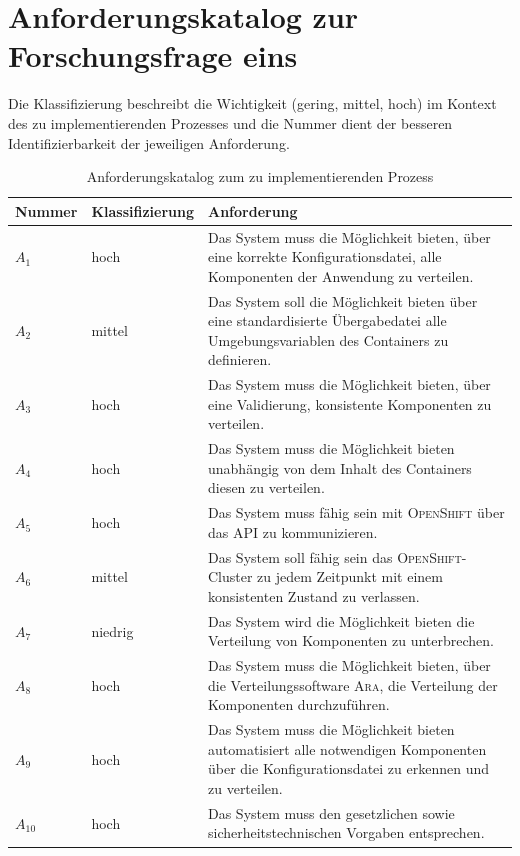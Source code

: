 \section{Anforderungskatalog zur Forschungsfrage eins}
Die Klassifizierung beschreibt die Wichtigkeit (gering, mittel, hoch) im Kontext des
zu implementierenden Prozesses und die Nummer dient der besseren Identifizierbarkeit der jeweiligen Anforderung.
\begin{table}[h!]
	\centering
	
	\begin{tabular}{@{}llp{9.0cm}@{}}\toprule[1.5pt]
		
		\textbf{Nummer} & \textbf{Klassifizierung} & \textbf{Anforderung} \\ \midrule
		
		$A_{1}$ & hoch & Das System muss die Möglichkeit bieten, über eine korrekte Konfigurationsdatei, alle Komponenten der Anwendung zu verteilen.           \\
		$A_{2}$ & mittel & Das System soll die Möglichkeit bieten über eine standardisierte Übergabedatei alle Umgebungsvariablen des Containers zu definieren. \\
		$A_{3}$ & hoch & Das System muss die Möglichkeit bieten, über eine Validierung, konsistente Komponenten zu verteilen.\\
		$A_{4}$ & hoch & Das System muss die Möglichkeit bieten unabhängig von dem Inhalt des Containers diesen zu verteilen.\\
		$A_{5}$ & hoch & Das System muss fähig sein mit \textsc{OpenShift} über das \ac{API} zu kommunizieren. \\
		$A_{6}$ & mittel & Das System soll fähig sein das \textsc{OpenShift}-Cluster zu jedem Zeitpunkt mit einem konsistenten Zustand zu verlassen. \\
		$A_{7}$ & niedrig & Das System wird die Möglichkeit bieten die Verteilung von Komponenten zu unterbrechen. \\
		$A_{8}$ & hoch & Das System muss die Möglichkeit bieten, über die Verteilungssoftware \textsc{Ara}, die Verteilung der Komponenten durchzuführen. \\
		$A_{9}$ & hoch & Das System muss die Möglichkeit bieten automatisiert alle notwendigen Komponenten über die Konfigurationsdatei zu erkennen und zu verteilen. \\
		$A_{10}$ & hoch & Das System muss den gesetzlichen sowie sicherheitstechnischen Vorgaben entsprechen.\\
		
		\bottomrule[1.5pt]
	\end{tabular}
	
	\caption{Anforderungskatalog zum zu implementierenden Prozess}
	\label{tab:anforderungslisteFF1}
	
\end{table}

